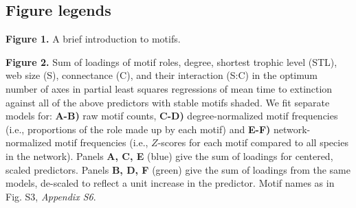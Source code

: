 \documentclass[12pt]{article}
\begin{document}
\clearpage

\begin{spacing}{2.0}
\section*{Figure legends}

        \textbf{Figure 1.} A brief introduction to motifs.

        \vspace{12pt}

        \noindent \textbf{Figure 2.} Sum of loadings of motif roles, degree, shortest trophic level (STL), web size (S), connectance (C), and their interaction (S:C) in the optimum number of axes in partial least squares regressions of mean time to extinction against all of the above predictors with stable motifs shaded. We fit separate models for: \textbf{A-B)} raw motif counts, \textbf{C-D)} degree-normalized motif frequencies (i.e., proportions of the role made up by each motif) and \textbf{E-F)} network-normalized motif frequencies (i.e., $Z$-scores for each motif compared to all species in the network). 
    	Panels \textbf{A, C, E} (blue) give the sum of loadings for centered, scaled predictors.
    	Panels \textbf{B, D, F} (green) give the sum of loadings from the same models, de-scaled to reflect a unit increase in the predictor.
    	Motif names as in Fig. S3, \emph{Appendix S6}.


    \vspace{12pt}


\end{spacing}
\end{document}
